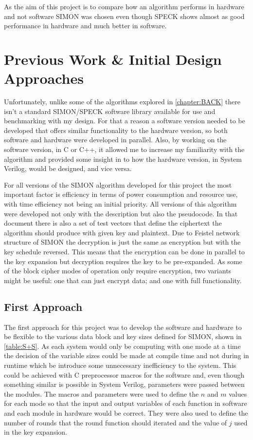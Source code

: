 \documentclass[12pt,twoside,a4paper]{report}
\begin{document}
	As the aim of this project is to compare how an algorithm performs in hardware and not software SIMON was chosen even though SPECK shows almost as good performance in hardware and much better in software. 
    
	\chapter{Previous Work \& Initial Design Approaches}
	\label{chapter:INITIAL}
	Unfortunately, unlike some of the algorithms explored in \autoref{chapter:BACK} there isn't a standard SIMON/SPECK software library available for use and benchmarking with my design. For that a reason a software version needed to be developed that offers similar functionality to the hardware version, so both software and hardware were developed in parallel. Also, by working on the software version, in C or C++, it allowed me to increase my familiarity with the algorithm and provided some insight in to how the hardware version, in System Verilog, would be designed, and vice versa.
    
	For all versions of the SIMON algorithm developed for this project the most important factor is efficiency in terms of power consumption and resource use, with time efficiency not being an initial priority. All versions of this algorithm were developed not only with the description but also the pseudocode\cite{Beaulieu2013}. In that document there is also a set of test vectors that define the ciphertext the algorithm should produce with given key and plaintext. Due to Feistel network structure of SIMON the decryption is just the same as encryption but with the key schedule reversed. This means that the encryption can be done in parallel to the key expansion but decryption requires the key to be pre-expanded. As some of the block cipher modes of operation\cite{Dworkin2001a} only require encryption, two variants might be useful: one that can just encrypt data; and one with full functionality.
    
	\section{First Approach}
	\label{section:first}
	The first approach for this project was to develop the software and hardware to be flexible to the various data block and key sizes defined for SIMON, shown in \autoref{table:S+S}. As each system would only be computing with one mode at a time the decision of the variable sizes could be made at compile time and not during in runtime which be introduce some unnecessary inefficiency to the system. This could be achieved with C preprocessor macros for the software and, even though something similar is possible in System Verilog, parameters were passed between the modules. The macros and parameters were used to define the $n$ and $m$ values for each mode so that the input and output variables of each function in software and each module in hardware would be correct. They were also used to define the number of rounds that the round function should iterated and the value of $j$ used in the key expansion.
    
\end{document}
